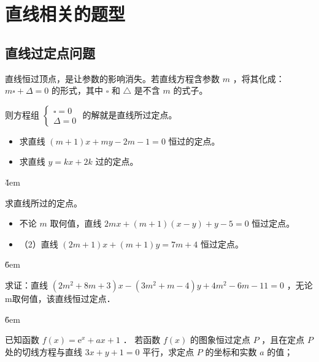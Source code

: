 \section{直线相关的题型}

\subsection{直线过定点问题}

\begin{theorem}
    直线恒过顶点，是让参数的影响消失。若直线方程含参数 $m$ ，将其化成：
    $m \square+\Delta=0$ 的形式，其中 $\square$ 和 $\triangle$ 是不含 $m$ 的式子。

    则方程组 $\left\{\begin{array}{l}\square=0 \\ \Delta=0\end{array}\right.$ 的解就是直线所过定点。
\end{theorem}

\begin{example}
    \begin{itemize}
        \item 求直线 $(m+1)x+my-2m-1=0$ 恒过的定点。
        \item 求直线 $y=kx+2k$ 过的定点。
    \end{itemize}
\end{example}

\v{4em}

\begin{example}
    求直线所过的定点。
    \begin{itemize}
        \item 不论 $m$ 取何值，直线 $2 m x+(m+1)(x-y)+y-5=0$ 恒过定点。
        \item （2）直线 $(2 m+1) x+(m+1) y=7 m+4$ 恒过定点。
    \end{itemize}
\end{example}

\v{6em}

\begin{example}
    求证：直线 $\left(2 m^2+8 m+3\right) x-\left(3 m^2+m-4\right) y+4 m^2-6 m-11=0$ ，无论m取何值，该直线恒过定点．
\end{example}

\v{6em}

\begin{example}
    已知函数 $f(x)=\mathrm{e}^x+a x+1$ ．
    若函数 $f(x)$ 的图象恒过定点 $P$ ，且在定点 $P$ 处的切线方程与直线 $3 x+y+1=0$ 平行，求定点 $P$ 的坐标和实数 $a$ 的值；
\end{example}

